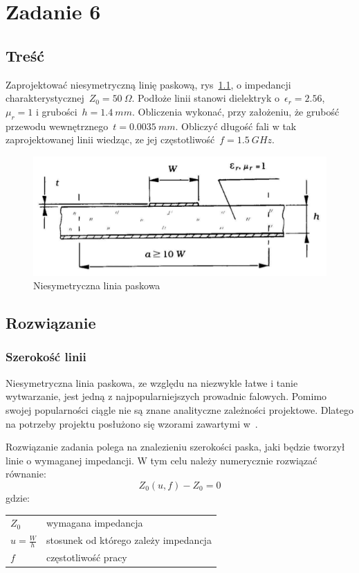 \documentclass[rep.tex]{subfiles}
\begin{document}
\chapter{Zadanie 6}
\label{zad6}
\section{Treść}
Zaprojektować niesymetryczną linię paskową, rys~\ref{fig:zad6:microstrip}, o impedancji charakterystycznej~$Z_0 = 50~\Omega$.
Podłoże linii stanowi dielektryk o~$\epsilon_r = 2.56$, $\mu_r = 1$ i grubości~$h =  1.4~mm$.
Obliczenia wykonać, przy założeniu, że grubość przewodu wewnętrznego~$t =  0.0035~mm$.
Obliczyć długość fali w tak zaprojektowanej linii wiedząc, ze jej częstotliwość~$f = 1.5~GHz$.

\begin{figure}[!htbp]
  \centering
  \includegraphics[scale=0.5]{fig/zad6/microstrip}
  \caption{Niesymetryczna linia paskowa}
  \label{fig:zad6:microstrip}
\end{figure}

\section{Rozwiązanie}
\subsection{Szerokość linii}
Niesymetryczna linia paskowa, ze względu na niezwykle łatwe i tanie wytwarzanie, jest jedną z najpopularniejszych prowadnic falowych.
Pomimo swojej popularności ciągle nie są znane analityczne zależności projektowe.
Dlatego na potrzeby projektu posłużono się wzorami zawartymi w~\cite{obwody}.

Rozwiązanie zadania polega na znalezieniu szerokości paska, jaki będzie tworzył linie o wymaganej impedancji.
W tym celu należy numerycznie rozwiązać równanie:
\begin{equation}
  Z_0(u, f) - Z_0 = 0 \label{eqn:zad6:target}
\end{equation}
gdzie:\\
\begin{tabular}{l @{ - } l}
  $Z_0$ & wymagana impedancja \\
  $u = \frac{W}{h}$ & stosunek od którego zależy impedancja \\
  $f$ & częstotliwość pracy
\end{tabular}
\end{document}
